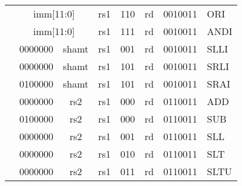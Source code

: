 \begin{table}[p]
\begin{small}
\begin{center}
\begin{tabular}{p{0in}p{0.4in}p{0.05in}p{0.05in}p{0.05in}p{0.05in}p{0.4in}p{0.6in}p{0.4in}p{0.6in}p{0.7in}l}
&
\multicolumn{6}{|c|}{imm[11:0]} &
\multicolumn{1}{c|}{rs1} &
\multicolumn{1}{c|}{110} &
\multicolumn{1}{c|}{rd} &
\multicolumn{1}{c|}{0010011} & ORI \\
\cline{2-11}


&
\multicolumn{6}{|c|}{imm[11:0]} &
\multicolumn{1}{c|}{rs1} &
\multicolumn{1}{c|}{111} &
\multicolumn{1}{c|}{rd} &
\multicolumn{1}{c|}{0010011} & ANDI \\
\cline{2-11}


&
\multicolumn{4}{|c|}{0000000} &
\multicolumn{2}{c|}{shamt} &
\multicolumn{1}{c|}{rs1} &
\multicolumn{1}{c|}{001} &
\multicolumn{1}{c|}{rd} &
\multicolumn{1}{c|}{0010011} & SLLI \\
\cline{2-11}


&
\multicolumn{4}{|c|}{0000000} &
\multicolumn{2}{c|}{shamt} &
\multicolumn{1}{c|}{rs1} &
\multicolumn{1}{c|}{101} &
\multicolumn{1}{c|}{rd} &
\multicolumn{1}{c|}{0010011} & SRLI \\
\cline{2-11}


&
\multicolumn{4}{|c|}{0100000} &
\multicolumn{2}{c|}{shamt} &
\multicolumn{1}{c|}{rs1} &
\multicolumn{1}{c|}{101} &
\multicolumn{1}{c|}{rd} &
\multicolumn{1}{c|}{0010011} & SRAI \\
\cline{2-11}


&
\multicolumn{4}{|c|}{0000000} &
\multicolumn{2}{c|}{rs2} &
\multicolumn{1}{c|}{rs1} &
\multicolumn{1}{c|}{000} &
\multicolumn{1}{c|}{rd} &
\multicolumn{1}{c|}{0110011} & ADD \\
\cline{2-11}


&
\multicolumn{4}{|c|}{0100000} &
\multicolumn{2}{c|}{rs2} &
\multicolumn{1}{c|}{rs1} &
\multicolumn{1}{c|}{000} &
\multicolumn{1}{c|}{rd} &
\multicolumn{1}{c|}{0110011} & SUB \\
\cline{2-11}


&
\multicolumn{4}{|c|}{0000000} &
\multicolumn{2}{c|}{rs2} &
\multicolumn{1}{c|}{rs1} &
\multicolumn{1}{c|}{001} &
\multicolumn{1}{c|}{rd} &
\multicolumn{1}{c|}{0110011} & SLL \\
\cline{2-11}


&
\multicolumn{4}{|c|}{0000000} &
\multicolumn{2}{c|}{rs2} &
\multicolumn{1}{c|}{rs1} &
\multicolumn{1}{c|}{010} &
\multicolumn{1}{c|}{rd} &
\multicolumn{1}{c|}{0110011} & SLT \\
\cline{2-11}


&
\multicolumn{4}{|c|}{0000000} &
\multicolumn{2}{c|}{rs2} &
\multicolumn{1}{c|}{rs1} &
\multicolumn{1}{c|}{011} &
\multicolumn{1}{c|}{rd} &
\multicolumn{1}{c|}{0110011} & SLTU \\
\cline{2-11}



\end{tabular}
\end{center}
\end{small}
\end{table}

